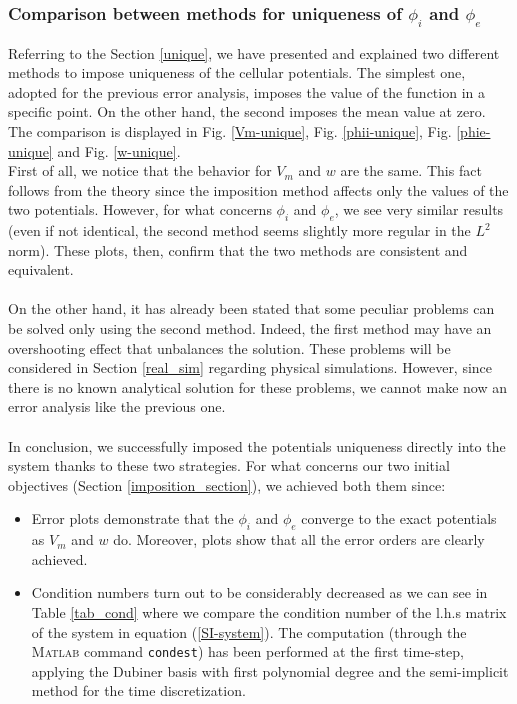 \documentclass[a4paper,11pt]{article}
\begin{document}
\subsubsection{Comparison between methods for uniqueness of $\phi_i$ and $\phi_e$}
Referring to the Section \ref{unique}, we have presented and explained two different methods to impose uniqueness of the cellular potentials.
The simplest one, adopted for the previous error analysis, imposes the value of the function in a specific point. On the other hand, the second imposes the mean value at zero. The comparison is displayed in Fig. \ref{Vm-unique}, Fig. \ref{phii-unique}, Fig. \ref{phie-unique} and Fig. \ref{w-unique}.\\
\noindent First of all, we notice that the behavior for $V_m$ and $w$ are the same. This fact follows from the theory since the imposition method affects only the values of the two potentials. However, for what concerns $\phi_i$ and $\phi_e$, we see very similar results (even if not identical, the second method seems slightly more regular in the $L^2$ norm). These plots, then, confirm that the two methods are consistent and equivalent. \\ \\
On the other hand, it has already been stated that some peculiar problems can be solved only using the second method. Indeed, the first method may have an overshooting effect that unbalances the solution. These problems will be considered in Section \ref{real_sim} regarding physical simulations. However, since there is no known analytical solution for these problems, we cannot make now an error analysis like the previous one.\\ \\
\noindent In conclusion, we successfully imposed the potentials uniqueness directly into the system thanks to these two strategies. For what concerns our two initial objectives (Section \ref{imposition_section}), we achieved both them since:
\begin{itemize}
	\item Error plots demonstrate that the $\phi_i$ and $\phi_e$ converge to the exact potentials as $V_m$ and $w$ do. Moreover, plots show that all the error orders are clearly achieved.
	\item Condition numbers turn out to be considerably decreased as we can see in Table \ref{tab_cond} where we compare the condition number of the l.h.s matrix of the system in equation (\ref{SI-system}). The computation (through the \textsc{Matlab} command \texttt{condest}) has been performed at the first time-step, applying the Dubiner basis with first polynomial degree and the semi-implicit method for the time discretization. 
\end{itemize}
\end{document}
